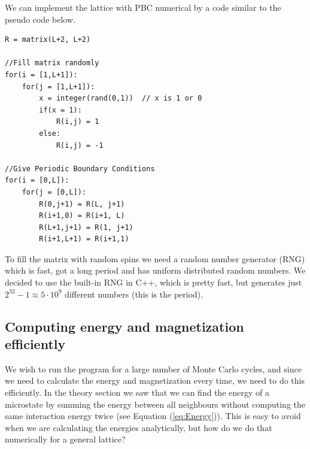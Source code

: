 \documentclass[norsk,a4paper,12pt]{article}
\begin{document}
We can implement the lattice with PBC numerical by a code similar to the pseudo code below.
\begin{lstlisting}
R = matrix(L+2, L+2)

//Fill matrix randomly
for(i = [1,L+1]):
    for(j = [1,L+1]):
        x = integer(rand(0,1))  // x is 1 or 0 
        if(x = 1):
            R(i,j) = 1
        else:
            R(i,j) = -1

//Give Periodic Boundary Conditions
for(i = [0,L]):
    for(j = [0,L]):
        R(0,j+1) = R(L, j+1)
        R(i+1,0) = R(i+1, L)
        R(L+1,j+1) = R(1, j+1)
        R(i+1,L+1) = R(i+1,1)
\end{lstlisting}
To fill the matrix with random spins we need a random number generator (RNG) which is fast, got a long period and has uniform distributed random numbers. We decided to use the built-in RNG in C++, which is pretty fast, but generates just $2^{32}-1\approx5\cdot10^9$ different numbers (this is the period). 

\subsection{Computing energy and magnetization efficiently}
We wish to run the program for a large number of Monte Carlo cycles, and since we need to calculate the energy and magnetization every time, we need to do this efficiently. In the theory section we saw that we can find the energy of a microstate by summing the energy between all neighbours without computing the same interaction energy twice (see Equation (\ref{eq:Energy})). This is easy to avoid when we are calculating the energies analytically, but how do we do that numerically for a general lattice? \par
\end{document}
